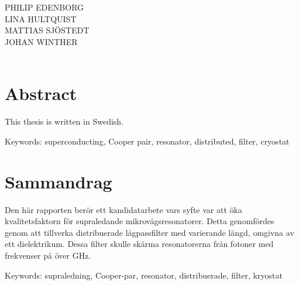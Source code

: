 \documentclass[../../main.tex]{subfiles}
\begin{document}
\titel\\
\undertitel\\
PHILIP EDENBORG\\LINA HULTQUIST\\MATTIAS SJÖSTEDT\\JOHAN WINTHER\\
\department\\
\university \setlength{\parskip}{0.5cm}

\thispagestyle{plain}			%
\setlength{\parskip}{0pt plus 1.0pt}
\section*{Abstract}


This thesis is written in Swedish.

\vfill
Keywords: superconducting, Cooper pair, resonator, distributed, filter, cryostat

\section*{Sammandrag}
Den här rapporten berör ett kandidatarbete vars syfte var att öka kvalitetsfaktorn för supraledande mikrovågsresonatorer. Detta genomfördes genom att tillverka distribuerade lågpassfilter med varierande längd, omgivna av ett dielektrikum. Dessa filter skulle skärma resonatorerna från fotoner med frekvenser på över \unit[88]{GHz}. 



\vfill
Keywords: supraledning, Cooper-par, resonator, distribuerade, filter, kryostat

\newpage\null\thispagestyle{empty}\newpage
\end{document}
